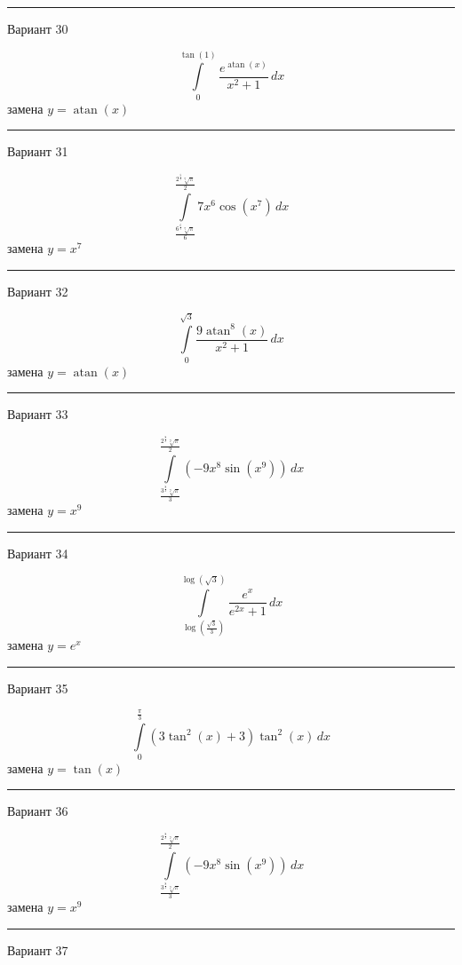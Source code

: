 \documentclass[11pt]{report}
\begin{document}
\rule{\textwidth}{.2mm}

Вариант 30

$$\int\limits_{0}^{\tan{\left(1 \right)}} \frac{e^{\operatorname{atan}{\left(x \right)}}}{x^{2} + 1}\, dx$$
замена $y = \operatorname{atan}{\left(x \right)}$



\rule{\textwidth}{.2mm}

Вариант 31

$$\int\limits_{\frac{6^{\frac{6}{7}} \sqrt[7]{\pi}}{6}}^{\frac{2^{\frac{5}{7}} \sqrt[7]{\pi}}{2}} 7 x^{6} \cos{\left(x^{7} \right)}\, dx$$
замена $y = x^{7}$



\rule{\textwidth}{.2mm}

Вариант 32

$$\int\limits_{0}^{\sqrt{3}} \frac{9 \operatorname{atan}^{8}{\left(x \right)}}{x^{2} + 1}\, dx$$
замена $y = \operatorname{atan}{\left(x \right)}$



\rule{\textwidth}{.2mm}

Вариант 33

$$\int\limits_{\frac{3^{\frac{8}{9}} \sqrt[9]{\pi}}{3}}^{\frac{2^{\frac{8}{9}} \sqrt[9]{\pi}}{2}} \left(- 9 x^{8} \sin{\left(x^{9} \right)}\right)\, dx$$
замена $y = x^{9}$



\rule{\textwidth}{.2mm}

Вариант 34

$$\int\limits_{\log{\left(\frac{\sqrt{3}}{3} \right)}}^{\log{\left(\sqrt{3} \right)}} \frac{e^{x}}{e^{2 x} + 1}\, dx$$
замена $y = e^{x}$



\rule{\textwidth}{.2mm}

Вариант 35

$$\int\limits_{0}^{\frac{\pi}{3}} \left(3 \tan^{2}{\left(x \right)} + 3\right) \tan^{2}{\left(x \right)}\, dx$$
замена $y = \tan{\left(x \right)}$



\rule{\textwidth}{.2mm}

Вариант 36

$$\int\limits_{\frac{3^{\frac{8}{9}} \sqrt[9]{\pi}}{3}}^{\frac{2^{\frac{8}{9}} \sqrt[9]{\pi}}{2}} \left(- 9 x^{8} \sin{\left(x^{9} \right)}\right)\, dx$$
замена $y = x^{9}$



\rule{\textwidth}{.2mm}

Вариант 37
\end{document}
